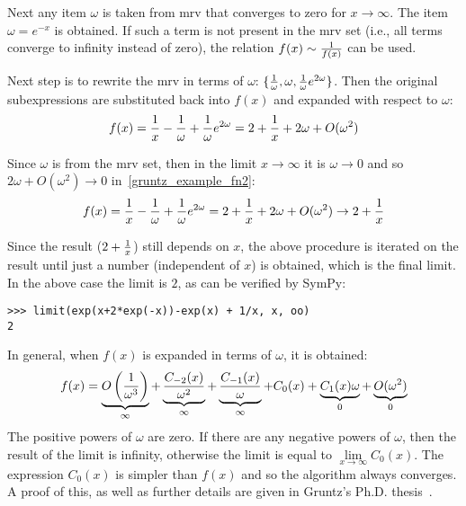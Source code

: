 Next any item $\omega$ is taken from mrv that converges to zero for
$x\to\infty$. The item $\omega=e^{-x}$ is obtained. If such a term is not
present in the mrv set (i.e., all terms converge to infinity instead of zero),
the relation $f(x)\sim {1\over f(x)}$ can be used.

Next step is to rewrite the mrv in terms of $\omega$: $\{{1\over\omega},
\omega, {1\over\omega}e^{2\omega}\}$. Then the original subexpressions are
substituted back into $f(x)$ and expanded with respect to $\omega$:
\begin{equation}
    \label{gruntz_example_fn2}
f(x) = {1\over x}-{1\over\omega}+{1\over\omega}e^{2\omega}
     = 2+{1\over x} + 2\omega + O(\omega^2)
\end{equation}

Since $\omega$ is from the mrv set, then in the limit $x\to\infty$ it is
$\omega\to0$ and so $2\omega + O(\omega^2) \to 0$ in~\eqref{gruntz_example_fn2}:
\begin{equation}
f(x) = {1\over x}-{1\over\omega}+{1\over\omega}e^{2\omega}
    = 2+{1\over x} + 2\omega + O(\omega^2)
    \to 2 + {1\over x}
\end{equation}

Since the result ($2+{1\over x}$) still depends on $x$, the above procedure is
iterated on the result until just a number (independent of $x$) is obtained,
which is the final limit. In the above case the limit is $2$, as can be
verified by SymPy:

\begin{verbatim}
>>> limit(exp(x+2*exp(-x))-exp(x) + 1/x, x, oo)
2
\end{verbatim}

In general, when $f(x)$ is expanded in terms of $\omega$, it is obtained:
\begin{equation}
f(x) = \underbrace{O\left({1\over \omega^3}\right)}_\infty
    + \underbrace{C_{-2}(x)\over \omega^2}_\infty
    + \underbrace{C_{-1}(x)\over \omega}_\infty
    + {C_{0}(x)}
    + \underbrace{C_{1}(x)\omega}_0
    + \underbrace{O(\omega^2)}_0
\end{equation}
The positive powers of $\omega$ are zero. If there are any negative powers of
$\omega$, then the result of the limit is infinity, otherwise the limit is
equal to $\lim\limits_{x\to\infty} C_0(x)$. The expression $C_0(x)$ is simpler
than $f(x)$ and so the algorithm always converges. A proof of this, as well as
further details are given in Gruntz's Ph.D. thesis~\cite{Gruntz1996limits}.
